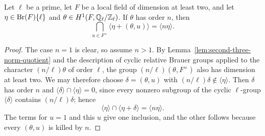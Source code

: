 \begin{lemma}\label{lem:second-three-cyclic-family}
Let $\ell$ be a prime, let $F$ be a local field of dimension at least two, and let $\eta\in\operatorname{Br}(F)\{\ell\}$ and $\theta\in H^1(F,\mathbb Q_\ell/\mathbb Z_\ell)$.
If $\theta$ has order $n$, then
\[
 \bigcap_{u\in F^\times}\langle\eta+(\theta,u)\rangle
   =\langle n\eta\rangle .
\]
\end{lemma}
\begin{proof}
The case $n=1$ is clear, so assume $n>1$.
By Lemma~\ref{lem:second-three-norm-quotient} and the description of cyclic relative Brauer groups applied to the character $(n/\ell)\theta$ of order $\ell$, the group $(n/\ell)(\theta,F^\times)$ also has dimension at least two.
We may therefore choose $\delta=(\theta,u)$ with $(n/\ell)\delta\notin\langle\eta\rangle$.
Then $\delta$ has order $n$ and $\langle\delta\rangle\cap\langle\eta\rangle=0$, since every nonzero subgroup of the cyclic $\ell$-group $\langle\delta\rangle$ contains $(n/\ell)\delta$; hence
\[
 \langle\eta\rangle\cap\langle\eta+\delta\rangle
     =\langle n\eta\rangle .
\]
The terms for $u=1$ and this $u$ give one inclusion, and the other follows because every $(\theta,u)$ is killed by $n$.
\end{proof}

